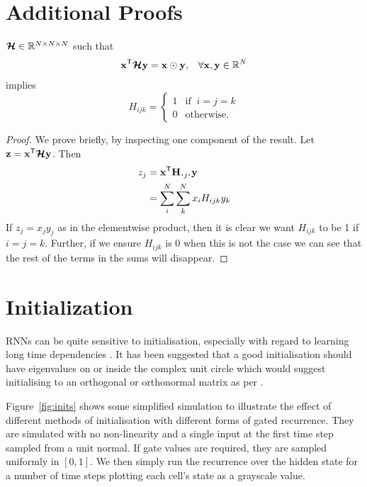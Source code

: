 \chapter{Additional Proofs}
\begin{prop}  \label{prop:identity}
	\(\bm{\mathcal{H}} \in \mathbb{R}^{N \times N \times N}\) such that
\begin{align}
\mathbf{x}^\mathsf{T}\bm{\mathcal{H}}\mathbf{y} = \mathbf{x} \odot \mathbf{y}, 
&&\forall \mathbf{x},\mathbf{y} \in \mathbb{R}^{N}
\end{align} implies
\begin{equation}
	H_{ijk} = \begin{cases}
		1 & \text{if}\;\;i = j = k \\
		0 & \text{otherwise.}
	\end{cases}
\end{equation}

\end{prop}
\begin{proof}
We prove briefly, by inspecting one component of the result. Let 
\(\mathbf{z} = \mathbf{x}^\mathsf{T}\bm{\mathcal{H}}\mathbf{y}\). Then
\begin{align}
	z_j &= \vec{x}^\mathsf{T}\mat{H}_{\midbullet j \midbullet}\vec{y} \\
		&= \sum_i^N\sum_k^N x_iH_{ijk}y_k
\end{align}
If \(z_j = x_jy_j\) as in the elementwise product, then it is clear we want \(H_{ijk}\) to be 
1 if \(i=j=k\). Further, if we ensure \(H_{ijk}\) is 0 when this is not the case we can see that
the rest of the terms in the sums will disappear.
\end{proof}

\chapter{Initialization}
RNNs can be quite sensitive to initialisation, especially with regard to learning long
time dependencies \autocite{Le2015}. It has been suggested that a good initialisation should
have eigenvalues on or inside the complex unit circle \autocite{Zilly2016, Mikolov2015} which
would suggest initialising to an orthogonal or orthonormal matrix as per \autocite{Henaff2016}.

Figure~\ref{fig:inits} shows some simplified simulation to illustrate the effect of
different methods of initialisation with different forms of gated recurrence. They are
simulated with no non-linearity and a single input at the first time step sampled from a unit
normal. If gate values are required, they are sampled uniformly in \([0,1]\). We then simply
run the recurrence over the hidden state for a number of time steps plotting each cell's state
as a grayscale value.


